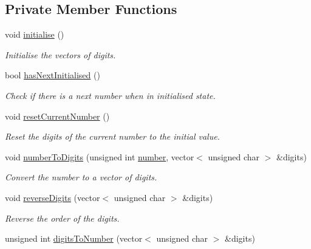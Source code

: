 \subsection*{Private Member Functions}
\begin{DoxyCompactItemize}
\item 
void \hyperlink{classmultiscale_1_1LexicographicNumberIterator_a943745c4723ed8c3c18df9f92bf94d2c}{initialise} ()
\begin{DoxyCompactList}\small\item\em Initialise the vectors of digits. \end{DoxyCompactList}\item 
bool \hyperlink{classmultiscale_1_1LexicographicNumberIterator_ac2754a1a57005183e2c9040719c97448}{has\-Next\-Initialised} ()
\begin{DoxyCompactList}\small\item\em Check if there is a next number when in initialised state. \end{DoxyCompactList}\item 
void \hyperlink{classmultiscale_1_1LexicographicNumberIterator_a18311f68a49156a415c817a947abcd7d}{reset\-Current\-Number} ()
\begin{DoxyCompactList}\small\item\em Reset the digits of the current number to the initial value. \end{DoxyCompactList}\item 
void \hyperlink{classmultiscale_1_1LexicographicNumberIterator_a700e18593ba0cc764d4e517993bd3fdc}{number\-To\-Digits} (unsigned int \hyperlink{classmultiscale_1_1LexicographicNumberIterator_a282d970d0d1a33d2736bbdf104c18336}{number}, vector$<$ unsigned char $>$ \&digits)
\begin{DoxyCompactList}\small\item\em Convert the number to a vector of digits. \end{DoxyCompactList}\item 
void \hyperlink{classmultiscale_1_1LexicographicNumberIterator_a4c0a17e03a12256584d9ed3ae19a78c9}{reverse\-Digits} (vector$<$ unsigned char $>$ \&digits)
\begin{DoxyCompactList}\small\item\em Reverse the order of the digits. \end{DoxyCompactList}\item 
unsigned int \hyperlink{classmultiscale_1_1LexicographicNumberIterator_a9bcb610b3b63b02ceed7d556960e57c3}{digits\-To\-Number} (vector$<$ unsigned char $>$ \&digits)

\end{DoxyCompactItemize}
